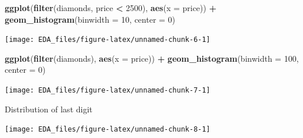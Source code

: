 \documentclass[]{book}
\newenvironment{Shaded}{\begin{snugshade}}{\end{snugshade}}
\newcommand{\DataTypeTok}[1]{\textcolor[rgb]{0.13,0.29,0.53}{#1}}
\newcommand{\DecValTok}[1]{\textcolor[rgb]{0.00,0.00,0.81}{#1}}
\newcommand{\KeywordTok}[1]{\textcolor[rgb]{0.13,0.29,0.53}{\textbf{#1}}}
\newcommand{\NormalTok}[1]{#1}
\newcommand{\OperatorTok}[1]{\textcolor[rgb]{0.81,0.36,0.00}{\textbf{#1}}}
\newcommand{\StringTok}[1]{\textcolor[rgb]{0.31,0.60,0.02}{#1}}
\theoremstyle{plain}
\theoremstyle{remark}
\begin{document}
\begin{Shaded}
\begin{Highlighting}[]
\KeywordTok{ggplot}\NormalTok{(}\KeywordTok{filter}\NormalTok{(diamonds, price }\OperatorTok{<}\StringTok{ }\DecValTok{2500}\NormalTok{), }\KeywordTok{aes}\NormalTok{(}\DataTypeTok{x =}\NormalTok{ price)) }\OperatorTok{+}
\StringTok{  }\KeywordTok{geom_histogram}\NormalTok{(}\DataTypeTok{binwidth =} \DecValTok{10}\NormalTok{, }\DataTypeTok{center =} \DecValTok{0}\NormalTok{)}
\end{Highlighting}
\end{Shaded}

\begin{center}\texttt{[image: EDA\_files/figure-latex/unnamed-chunk-6-1]} \end{center}

\begin{Shaded}
\begin{Highlighting}[]
\KeywordTok{ggplot}\NormalTok{(}\KeywordTok{filter}\NormalTok{(diamonds), }\KeywordTok{aes}\NormalTok{(}\DataTypeTok{x =}\NormalTok{ price)) }\OperatorTok{+}
\StringTok{  }\KeywordTok{geom_histogram}\NormalTok{(}\DataTypeTok{binwidth =} \DecValTok{100}\NormalTok{, }\DataTypeTok{center =} \DecValTok{0}\NormalTok{)}
\end{Highlighting}
\end{Shaded}

\begin{center}\texttt{[image: EDA\_files/figure-latex/unnamed-chunk-7-1]} \end{center}

Distribution of last digit

\begin{Shaded}
\end{Shaded}

\begin{center}\texttt{[image: EDA\_files/figure-latex/unnamed-chunk-8-1]} \end{center}
\end{document}

